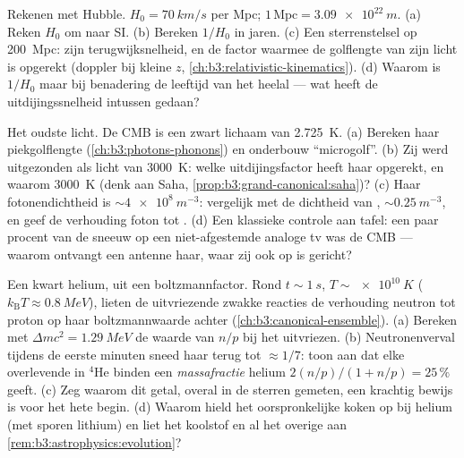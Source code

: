 \begin{exercise}[$\star\star\star$]\label{exo:b3:astrophysics:9}
Rekenen met Hubble. $H_0 = \qty{70}{km/s}$ per Mpc; $1\,
\text{Mpc} = \qty{3.09e22}{m}$. (a) Reken $H_0$ om naar SI. (b)
Bereken $1/H_0$ in jaren. (c) Een sterrenstelsel op \qty{200}{Mpc}: zijn
terugwijksnelheid, en de factor waarmee de golflengte van zijn licht
is opgerekt (doppler bij kleine $z$,
\cref{ch:b3:relativistic-kinematics}). (d) Waarom is $1/H_0$ maar
bij benadering de leeftijd van het heelal --- wat heeft de uitdijings\-snelheid
intussen gedaan?
\end{exercise}

\begin{exercise}[$\star\star\star$]\label{exo:b3:astrophysics:10}
Het oudste licht. De CMB is een zwart lichaam van \qty{2.725}{K}. (a)
Bereken haar piekgolflengte (\cref{ch:b3:photons-phonons}) en
onderbouw ``microgolf''. (b) Zij werd uitgezonden als licht van
\qty{3000}{K}: welke uitdijingsfactor heeft haar opgerekt,
en waarom \qty{3000}{K} (denk aan Saha,
\cref{prop:b3:grand-canonical:saha})? (c) Haar fotonendichtheid is
$\sim\qty{4e8}{m^{-3}}$: vergelijk met de dichtheid van ,
$\sim\qty{0.25}{m^{-3}}$, en geef de verhouding foton tot .
(d) Een klassieke controle aan tafel: een paar procent van de sneeuw op een niet-afgestemde
analoge tv was de CMB --- waarom ontvangt een antenne haar,
waar zij ook op is gericht?
\end{exercise}

\begin{exercise}[$\star\star\star$]\label{exo:b3:astrophysics:11}
Een kwart helium, uit een boltzmannfactor. Rond $t \sim
\qty{1}{s}$, $T \sim \qty{e10}{K}$ ($k_{\text{B}}T \approx
\qty{0.8}{MeV}$), lieten de uitvriezende zwakke reacties de
verhouding neutron tot proton op haar boltzmannwaarde achter
(\cref{ch:b3:canonical-ensemble}). (a) Bereken met $\Delta mc^2 =
\qty{1.29}{MeV}$ de waarde van $n/p$ bij het uitvriezen. (b) Neutronenverval
tijdens de eerste minuten sneed haar terug tot $\approx1/7$: toon aan dat
elke overlevende in $^4$He binden een \emph{massafractie}
helium $2(n/p)/(1 + n/p) = 25\,\%$ geeft. (c) Zeg waarom dit getal,
overal in de sterren gemeten, een krachtig bewijs is voor het hete
begin. (d) Waarom hield het oorspronkelijke koken op bij helium
(met sporen lithium) en liet het koolstof en al het overige aan
\cref{rem:b3:astrophysics:evolution}?
\end{exercise}

